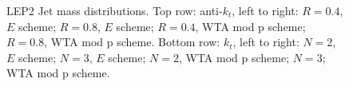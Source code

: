 \begin{figure}[H]
\hfill
{}\hfill
{}\hfill
\caption{LEP2 Jet mass distributions. Top row: anti-$k_t$, left to right: $R=0.4$, $E$ scheme; $R=0.8$, $E$ scheme; $R=0.4$, WTA mod p scheme; $R=0.8$, WTA mod p scheme. Bottom row: $k_t$, left to right: $N=2$, $E$ scheme; $N=3$, $E$ scheme; $N=2$, WTA mod p scheme; $N=3$; WTA mod p scheme.}  
\end{figure}

